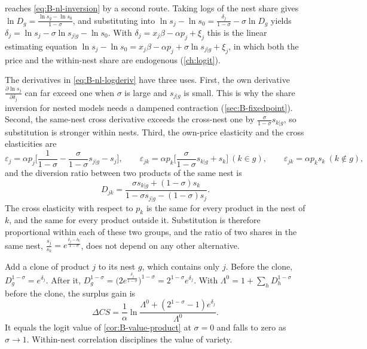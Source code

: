 \citet[eqs.~26--27, p.~253]{Berry1994} reaches \eqref{eq:B-nl-inversion} by a second route. Taking logs of the
nest share gives $\ln D_g = \frac{\ln s_g - \ln s_0}{1 - \sigma}$, and substituting into
$\ln s_j - \ln s_0 = \frac{\delta_j}{1 - \sigma} - \sigma\ln D_g$ yields $\delta_j = \ln s_j - \sigma\ln s_{j|g} - \ln s_0$. With
$\delta_j = x_j\beta - \alpha p_j + \xi_j$ this is the linear estimating equation
$\ln s_j - \ln s_0 = x_j\beta - \alpha p_j + \sigma\ln s_{j|g} + \xi_j$, in which both the price and the within-nest share
are endogenous (\cref{ch:logit}).

The derivatives in \eqref{eq:B-nl-logderiv} have three uses. First, the own derivative
$\frac{\partial\ln s_j}{\partial\delta_j}$ can far exceed one when $\sigma$ is large and $s_{j|g}$ is small. This is why the
share inversion for nested models needs a dampened contraction (\cref{sec:B-fixedpoint}). Second, the same-nest
cross derivative exceeds the cross-nest one by $\frac{\sigma}{1 - \sigma}s_{k|g}$, so substitution is stronger within
nests. Third, the own-price elasticity and the cross elasticities are
\begin{equation*}
\varepsilon_j = \alpha p_j\Big[\frac{1}{1 - \sigma} - \frac{\sigma}{1 - \sigma}s_{j|g} - s_j\Big],
\qquad
\varepsilon_{jk} = \alpha p_k\Big[\frac{\sigma}{1 - \sigma}s_{k|g} + s_k\Big]\ (k \in g),
\qquad
\varepsilon_{jk} = \alpha p_ks_k\ (k \notin g),
\end{equation*}
and the diversion ratio between two products of the same nest is
\begin{equation*}
D_{jk} = \frac{\sigma s_{k|g} + (1 - \sigma)s_k}{1 - \sigma s_{j|g} - (1 - \sigma)s_j} .
\end{equation*}
The cross elasticity with respect to $p_k$ is the same for every product in the nest of $k$, and the same for
every product outside it. Substitution is therefore proportional within each of these two groups, and the
ratio of two shares in the same nest, $\frac{s_j}{s_k} = e^{\frac{\delta_j - \delta_k}{1 - \sigma}}$, does not depend on any
other alternative.

\begin{remark}\label{rem:B-nl-clone}
Add a clone of product $j$ to its nest $g$, which contains only $j$. Before the clone, $D_g^{1 - \sigma} = e^{\delta_j}$.
After it, $D_g^{1 - \sigma} = \big(2e^{\frac{\delta_j}{1 - \sigma}}\big)^{1 - \sigma} = 2^{1 - \sigma}e^{\delta_j}$. With
$\Lambda^0 = 1 + \sum_hD_h^{1 - \sigma}$ before the clone, the surplus gain is
\begin{equation*}
\Delta CS = \frac{1}{\alpha}\ln\frac{\Lambda^0 + (2^{1 - \sigma} - 1)e^{\delta_j}}{\Lambda^0} .
\end{equation*}
It equals the logit value of \cref{cor:B-value-product} at $\sigma = 0$ and falls to zero as $\sigma \to 1$. Within-nest correlation disciplines the
value of variety.
\end{remark}

